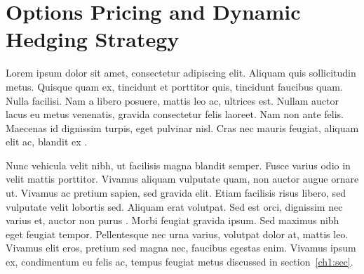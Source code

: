 \chapter{Options Pricing and Dynamic Hedging Strategy}

Lorem ipsum dolor sit amet, consectetur adipiscing elit. Aliquam quis sollicitudin metus. Quisque quam ex, tincidunt et porttitor quis, tincidunt faucibus quam. Nulla facilisi. Nam a libero posuere, mattis leo ac, ultrices est. Nullam auctor lacus eu metus venenatis, gravida consectetur felis laoreet. Nam non ante felis. Maecenas id dignissim turpis, eget pulvinar nisl. Cras nec mauris feugiat, aliquam elit ac, blandit ex \cite{article-full}.

Nunc vehicula velit nibh, ut facilisis magna blandit semper. Fusce varius odio in velit mattis porttitor. Vivamus aliquam vulputate quam, non auctor augue ornare ut. Vivamus ac pretium sapien, sed gravida elit. Etiam facilisis risus libero, sed vulputate velit lobortis sed. Aliquam erat volutpat. Sed est orci, dignissim nec varius et, auctor non purus \cite{proceedings-minimal,phdthesis-full}. Morbi feugiat gravida ipsum. Sed maximus nibh eget feugiat tempor. Pellentesque nec urna varius, volutpat dolor at, mattis leo. Vivamus elit eros, pretium sed magna nec, faucibus egestas enim. Vivamus ipsum ex, condimentum eu felis ac, tempus feugiat metus discussed in section~\ref{ch1:sec}.

